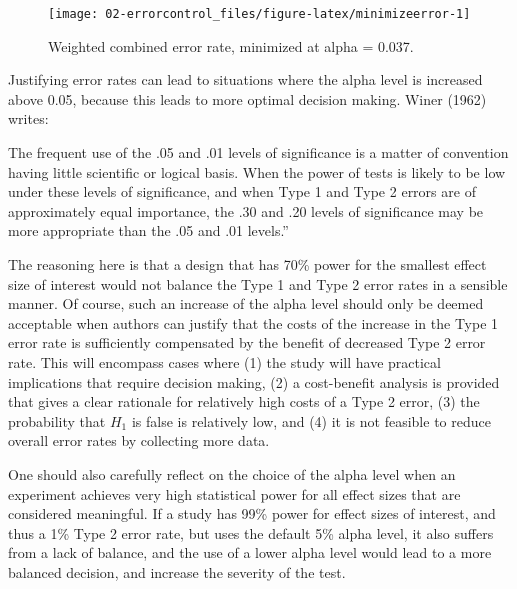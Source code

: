 \documentclass[
  oneside]{krantz}
\renewenvironment{quote}{\begin{VF}}{\end{VF}}
\begin{document}
\begin{figure}

{\centering \texttt{[image: 02-errorcontrol\_files/figure-latex/minimizeerror-1]} 

}

\caption{Weighted combined error rate, minimized at alpha = 0.037.}\label{fig:minimizeerror}
\end{figure}

Justifying error rates can lead to situations where the alpha level is increased above 0.05, because this leads to more optimal decision making. Winer (1962) writes:

\begin{quote}
The frequent use of the .05 and .01 levels of significance is a matter of convention having little scientific or logical basis. When the power of tests is likely to be low under these levels of significance, and when Type 1 and Type 2 errors are of approximately equal importance, the .30 and .20 levels of significance may be more appropriate than the .05 and .01 levels.''
\end{quote}

The reasoning here is that a design that has 70\% power for the smallest effect size of interest would not balance the Type 1 and Type 2 error rates in a sensible manner. Of course, such an increase of the alpha level should only be deemed acceptable when authors can justify that the costs of the increase in the Type 1 error rate is sufficiently compensated by the benefit of decreased Type 2 error rate. This will encompass cases where (1) the study will have practical implications that require decision making, (2) a cost-benefit analysis is provided that gives a clear rationale for relatively high costs of a Type 2 error, (3) the probability that \(H_1\) is false is relatively low, and (4) it is not feasible to reduce overall error rates by collecting more data.

One should also carefully reflect on the choice of the alpha level when an experiment achieves very high statistical power for all effect sizes that are considered meaningful. If a study has 99\% power for effect sizes of interest, and thus a 1\% Type 2 error rate, but uses the default 5\% alpha level, it also suffers from a lack of balance, and the use of a lower alpha level would lead to a more balanced decision, and increase the severity of the test.
\end{document}
